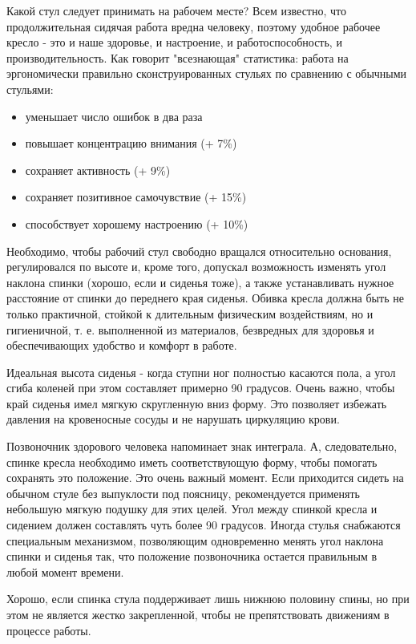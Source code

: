 \documentclass[russian,utf8,emptystyle]{eskdtext}
\begin{document}
\begin{spacing}{1.5}
Какой стул следует принимать на рабочем месте? Всем известно, что продолжительная сидячая работа вредна человеку, поэтому удобное рабочее кресло - это и наше здоровье, и настроение, и работоспособность, и производительность. Как говорит "всезнающая" статистика: работа на эргономически правильно сконструированных стульях по сравнению с обычными стульями:
\begin{itemize}
\item уменьшает число ошибок в два раза
\item повышает концентрацию внимания (+ 7\%)
\item сохраняет активность (+ 9\%)
\item сохраняет позитивное самочувствие (+ 15\%)
\item способствует хорошему настроению (+ 10\%)
\end{itemize}

Необходимо, чтобы рабочий стул свободно вращался относительно основания, регулировался по высоте и, кроме того, допускал возможность изменять угол наклона спинки (хорошо, если и сиденья тоже), а также устанавливать нужное расстояние от спинки до переднего края сиденья. Обивка кресла должна быть не только практичной, стойкой к длительным физическим воздействиям, но и гигиеничной, т. е. выполненной из материалов, безвредных для здоровья и обеспечивающих удобство и комфорт в работе.

Идеальная высота сиденья - когда ступни ног полностью касаются пола, а угол сгиба коленей при этом составляет примерно 90 градусов. Очень важно, чтобы край сиденья имел мягкую скругленную вниз форму. Это позволяет избежать давления на кровеносные сосуды и не нарушать циркуляцию крови.

Позвоночник здорового человека напоминает знак интеграла. А, следовательно, спинке кресла необходимо иметь соответствующую форму, чтобы помогать сохранять это положение. Это очень важный момент. Если приходится сидеть на обычном стуле без выпуклости под поясницу, рекомендуется применять небольшую мягкую подушку для этих целей. Угол между спинкой кресла и сидением должен составлять чуть более 90 градусов. Иногда стулья снабжаются специальным механизмом, позволяющим одновременно менять угол наклона спинки и сиденья так, что положение позвоночника остается правильным в любой момент времени.

Хорошо, если спинка стула поддерживает лишь нижнюю половину спины, но при этом не является жестко закрепленной, чтобы не препятствовать движениям в процессе работы. 


\end{spacing}
\end{document}
